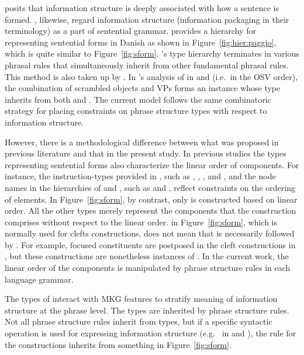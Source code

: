 \citet{lambrecht:96} posits that information structure is deeply
associated with how a sentence is formed. \citet{engdahl:vallduvi:96},
likewise, regard information structure (information packaging in their
terminology) as a part of sentential grammar. \citet{paggio:09}
provides a hierarchy for representing sentential forms in Danish as
shown in Figure~\ref{fig:hier:paggio}, which is
quite similar to Figure~\ref{fig:sform}. \citeauthor{paggio:09}'s type
hierarchy terminates in various phrasal rules that simultaneously
inherit from other fundamental phrasal rules. This method is also
taken up by \citet{song:bender:11}.  In \citeauthor{song:bender:11}'s
analysis of  in  and 
(i.e.\ in the OSV order), the combination of scrambled objects and VPs
forms an instance whose type inherits from both 
and . The current model follows the same
combinatoric strategy for placing constraints on phrase structure
types with respect to information structure.


However, there is a methodological difference between what was
proposed in previous literature and that in the present study. In
previous studies the types representing sentential forms also
characterize the linear order of components. For instance, the
instruction-types provided in \citet{engdahl:vallduvi:96}, such as
, , , and
, and the node names in the hierarchies of
\citet{paggio:09} and \citet{song:bender:11}, such as
 and , reflect constraints on the
ordering of elements.  In Figure~\ref{fig:sform},
by contrast, only  is constructed based on linear
order. All the other types merely represent the components that the
construction comprises without respect to the linear
order.  in Figure~\ref{fig:sform}, which is normally
used for clefts constructions, does not mean that
 is necessarily followed by .  For example, focused
constituents are postposed in the cleft constructions in 
\citep{kim:yang:09}, but these constructions are nonetheless instances
of .  In the current work, the linear order of the
components is manipulated by phrase structure rules in each language
grammar.




The types of  interact with MKG features to stratify
meaning of information structure at the phrase
level. The  types are inherited by
phrase structure rules. Not all phrase structure rules inherit from
 types, but if a specific syntactic operation is used for
expressing information structure (e.g.\  in
 and ), the rule for the constructions
inherits from something in Figure~\ref{fig:sform}.



